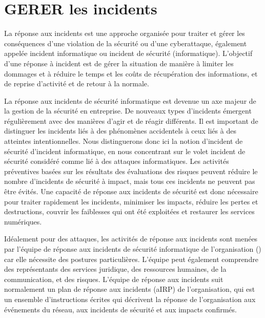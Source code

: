 %
%
\section{GERER les incidents}

La réponse aux incidents est une approche organisée pour traiter et gérer les conséquences d'une violation de la sécurité ou d'une cyberattaque, également appelée incident informatique ou incident de sécurité (informatique). L'objectif d'une réponse à incident est de gérer la situation de manière à limiter les dommages et à réduire le temps et les coûts de récupération des informations, et de reprise d'activité et de retour à la normale.

La réponse aux incidents de sécurité informatique est devenue un axe majeur de la gestion de la sécurité en entreprise. De nouveaux types d'incidents émergent régulièrement avec des manières d'agir et de réagir différents. Il est important de distinguer les incidents liés à des phénomènes accidentels à ceux liés à des atteintes intentionnelles. Nous distinguerons donc ici la notion d'incident de sécurité d'incident informatique, en nous concentrant sur le volet incident de sécurité considéré comme lié à des attaques informatiques.  
Les activités préventives basées sur les résultats des évaluations des risques peuvent réduire le nombre d'incidents de sécurité à impact, mais tous ces incidents ne peuvent pas être évités. Une capacité de réponse aux incidents de sécurité est donc nécessaire pour traiter rapidement les incidents, minimiser les impacts, réduire les pertes et destructions, couvrir les faiblesses qui ont été exploitées et restaurer les services numériques. 

Idéalement pour des attaques, les activités de réponse aux incidents sont menées par l'équipe de réponse aux incidents de sécurité informatique de l'organisation () car elle nécessite des postures particulières.  L'équipe peut également comprendre des représentants des services juridique, des ressources humaines, de la communication, et des risques. L'équipe de réponse aux incidents suit normalement un plan de réponse aux incidents (\gls{aIRP}) de l'organisation, qui est un ensemble d'instructions écrites qui décrivent la réponse de l'organisation aux événements du réseau, aux incidents de sécurité et aux impacts confirmés. 

